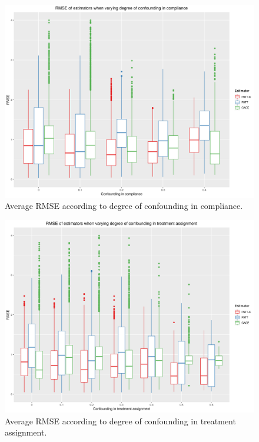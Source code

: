 \documentclass[hidelinks,12pt]{article}
\begin{document}
\begin{appendices}
\begin{figure}[htbp]
	\begin{center}
		\includegraphics[width = 1\textwidth]{rmse_boxplots_RateConC.png}
		\caption{Average RMSE according to degree of confounding in compliance.\label{fig:rmse_boxplots_RateConC}}
	\end{center}
\end{figure}

\begin{figure}[htbp]
	\begin{center}
		\includegraphics[width = 1\textwidth]{rmse_boxplots_RateConT.png}
		\caption{Average RMSE according to degree of confounding in treatment assignment.\label{fig:rmse_boxplots_RateConT}}
	\end{center}
\end{figure}


\end{appendices}
\end{document}
